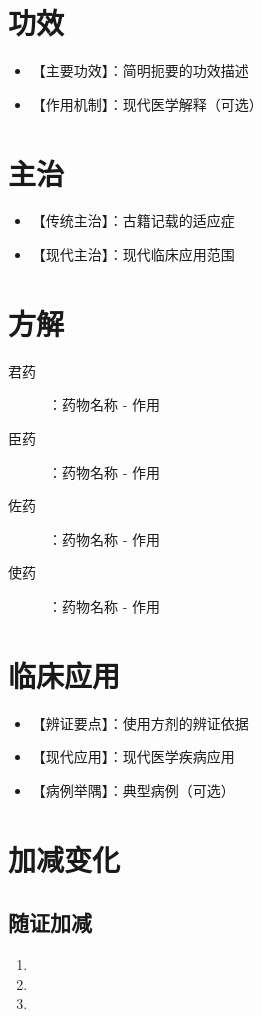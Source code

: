 \documentclass[12pt,UTF8]{ctexbook}
\begin{document}
\section{功效}
\begin{itemize}
	\item 【主要功效】：简明扼要的功效描述
	\item 【作用机制】：现代医学解释（可选）
\end{itemize}

\section{主治}
\begin{itemize}
	\item 【传统主治】：古籍记载的适应症
	\item 【现代主治】：现代临床应用范围
\end{itemize}

\section{方解}
\begin{description}
	\item[君药]：药物名称 - 作用
	\item[臣药]：药物名称 - 作用
	\item[佐药]：药物名称 - 作用
	\item[使药]：药物名称 - 作用
\end{description}

\section{临床应用}
\begin{itemize}
	\item 【辨证要点】：使用方剂的辨证依据
	\item 【现代应用】：现代医学疾病应用
	\item 【病例举隅】：典型病例（可选）
\end{itemize}

\section{加减变化}
\subsection{随证加减}
\begin{enumerate}[leftmargin=2cm]
	\item 
	\item 
	\item 
\end{enumerate}
\end{document}
